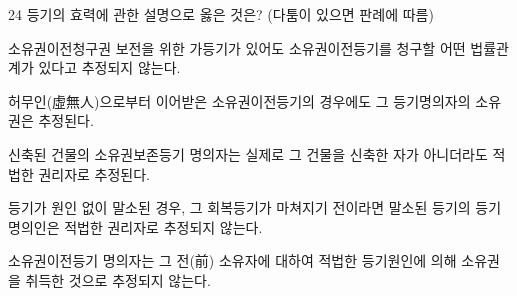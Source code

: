 \begin{question}{24}
등기의 효력에 관한 설명으로 옳은 것은? (다툼이 있으면 판례에 따름)
\begin{choices}
  \item 소유권이전청구권 보전을 위한 가등기가 있어도 소유권이전등기를 청구할 어떤 법률관계가 있다고 추정되지 않는다.
  \item 허무인(虛無人)으로부터 이어받은 소유권이전등기의 경우에도 그 등기명의자의 소유권은 추정된다.
  \item 신축된 건물의 소유권보존등기 명의자는 실제로 그 건물을 신축한 자가 아니더라도 적법한 권리자로 추정된다.
  \item 등기가 원인 없이 말소된 경우, 그 회복등기가 마쳐지기 전이라면 말소된 등기의 등기명의인은 적법한 권리자로 추정되지 않는다.
  \item 소유권이전등기 명의자는 그 전(前) 소유자에 대하여 적법한 등기원인에 의해 소유권을 취득한 것으로 추정되지 않는다.
\end{choices}
\end{question}
